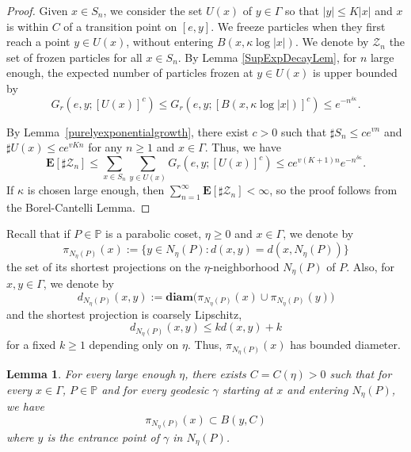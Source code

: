 \documentclass{amsart}
\newcommand{\showcomments}{yes}
\newenvironment{comment}%
{\ifthenelse{\equal{\showcomments}{yes}}%
{\footnotemark
    \begin{lrbox}{\commentbox}
    \begin{minipage}[t]{1.25in}\raggedright\sffamily\upshape\tiny
    \footnotemark[\arabic{footnote}]}%
{\begin{lrbox}{\commentbox}}}%
{\ifthenelse{\equal{\showcomments}{yes}}%
{\end{minipage}\end{lrbox}\marginpar{\usebox{\commentbox}}}%
{\end{lrbox}}}
\newtheorem{lem}[thm]{Lemma}
\theoremstyle{definition}
\theoremstyle{remark}
\newcommand{\diam }[1]{{\textbf{diam}\big(#1\big)}}
\begin{document}
\begin{proof}
Given $x\in S_n$, we consider the set $U(x)$ of $y\in\Gamma$ so that $|y|\le K|x|$ and $x$ is within $C$ of a transition point on $[e,y]$. We freeze particles when they first reach a point $y\in U(x)$, without entering $B(x,\kappa \log |x|)$.
We denote by $\mathcal{Z}_n$ the set of frozen particles for all $x\in S_n$.
By Lemma \ref{SupExpDecayLem}, for $n$ large enough,    the expected number of  particles frozen at $y\in U(x)$   is upper bounded by
$$
G_{r}(e,y; [U(x)]^c) \le G_{r}(e,y; [B(x,\kappa \log |x|)]^c) \le e^{-   n^{\delta \kappa }}. 
$$  

By Lemma~\ref{purelyexponentialgrowth}, there exist $c>0$ such that $\sharp S_n\le c e^{vn}$ and $\sharp U(x)\le c e^{vKn}$ for any $n\ge 1$ and $x\in \Gamma$. Thus,   we have
$$
\mathbf E[\sharp \mathcal Z_n]\le \sum_{x\in S_n}  \sum_{y\in U(x)} G_{r}(e,y; [U(x)]^c) \le  c e^{v(K+1)n} e^{-   n^{\delta\kappa}}.   
$$
If $\kappa$ is chosen large enough, then $\sum_{n=1}^\infty \mathbf E[\sharp \mathcal Z_n]<\infty$, so the proof follows from the  Borel-Cantelli Lemma.
\end{proof}
Recall that if $P\in \mathbb P$ is a parabolic coset, $\eta\geq 0$ and $x\in \Gamma$, we denote by $$\pi_{N_\eta(P)}(x) :=\{y\in N_\eta(P): d(x,y)=d(x, N_\eta(P))\}$$ the set of its shortest projections on the $\eta$-neighborhood $N_\eta(P)$ of $P$. 
Also, for $x,y\in \Gamma$, we denote by $$d_{N_\eta(P)}(x,y):=\diam{\pi_{N_\eta(P)}(x)\cup\pi_{N_\eta(P)}(y)}$$
and \cite[Corollary~8.2]{Hruska} the shortest projection is coarsely Lipschitz,
$$d_{N_\eta(P)}(x,y)\le kd(x,y)+k$$ for a fixed $k\ge 1$ depending only on $\eta$. Thus, $\pi_{N_\eta(P)}(x)$ has  bounded diameter. 





\begin{lem}\label{ProjectionLem}\cite[Lemma~1.15]{Sistoprojections}
For every large enough $\eta$, there exists $C=C(\eta)>0$ such that
for every $x\in \Gamma$, $P\in \mathbb P$ and for every geodesic $\gamma$ starting at $x$ and entering $N_\eta(P)$, we have
$$
\pi_{N_\eta(P)}(x) \subset B(y,C) 
$$
where $y$ is the entrance point of $\gamma$ in $N_\eta(P)$.
\end{lem}
\end{document}
